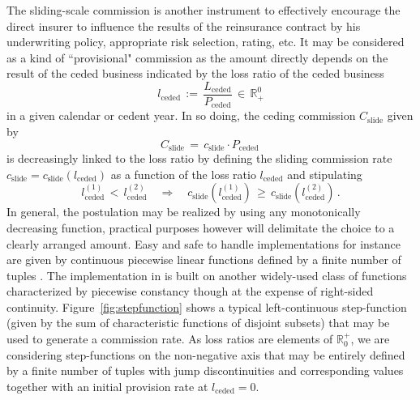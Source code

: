 The sliding-scale commission is another instrument to effectively encourage the direct insurer to
influence the results of the reinsurance contract by his underwriting policy, appropriate risk selection, rating, etc.
It may be considered as a kind of ``provisional" commission as the amount directly depends on the result of the
ceded business indicated by the loss ratio of the ceded business
\[    l_{\mathrm{ceded}}\,:=\,\frac{L_{\mathrm{ceded}}}{{P_\mathrm{ceded}}}\,\in\,\mathbb R^0_+\]
in a given calendar or cedent year.
In so doing, the ceding commission $C_{\mathrm{slide}}$ given by
\[  C_{\mathrm{slide}}\,=\,c_{\mathrm{slide}}\cdot P_\mathrm{ceded}\,\]
is decreasingly linked to the loss ratio by defining the
sliding commission rate $c_{\mathrm{slide}}=c_{\mathrm{slide}}(l_{\mathrm{ceded}})$
as a function of the loss ratio $l_{\mathrm{ceded}}$ and stipulating
\[  l_{\mathrm{ceded}}^{(1)}\,<\, l^{(2)}_{\mathrm{ceded}}\quad\Longrightarrow\quad
c_{\mathrm{slide}}(l_{\mathrm{ceded}}^{(1)})\,\geq\,   c_{\mathrm{slide}}(l_{\mathrm{ceded}}^{(2)})\,.\]
In general, the postulation may be realized by using any monotonically decreasing function,
practical purposes however will delimitate the choice to a clearly arranged amount.
Easy and safe to handle implementations for instance are given by continuous piecewise
linear functions defined by a finite number of tuples 
.
The implementation in \PO{} is built on another widely-used class of functions
characterized by piecewise constancy though at the expense of right-sided continuity.
Figure~\ref{fig:stepfunction}
shows a typical left-continuous step-function (given by the sum
of characteristic functions of disjoint subsets) that
may be used to generate a commission rate. As loss ratios are elements of $\mathbb R^+_0$, 
we are considering step-functions on the non-negative axis that may be entirely defined by a 
finite number of tuples with jump discontinuities and corresponding values 
together with an initial provision rate at
$l_{\mathrm{ceded}}=0$.


